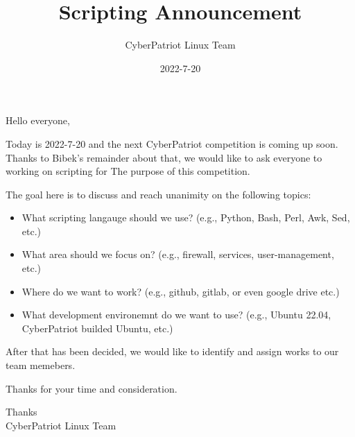 \documentclass{article}
\title{Scripting Announcement}
\author{CyberPatriot Linux Team}
\date{2022-7-20}
\begin{document}
\maketitle

Hello everyone,

Today is 2022-7-20 and the next CyberPatriot competition is coming up soon. Thanks to
Bibek's remainder about that, we would like to ask everyone to working on scripting for
The purpose of this competition.

The goal here is to discuss and reach unanimity on the following topics:

\begin{itemize}
    \item What scripting langauge should we use? (e.g., Python, Bash, Perl, Awk, Sed, etc.)
    \item What area should we focus on? (e.g., firewall, services, user-management, etc.)
    \item Where do we want to work? (e.g., github, gitlab, or even google drive etc.)
    \item What development environemnt do we want to use? (e.g., Ubuntu 22.04,
          CyberPatriot builded Ubuntu, etc.)
\end{itemize}

After that has been decided, we would like to identify and assign works to our team
memebers.

Thanks for your time and consideration.

\begin{flushright}
    Thanks \\
    CyberPatriot Linux Team
\end{flushright}
\end{document}
